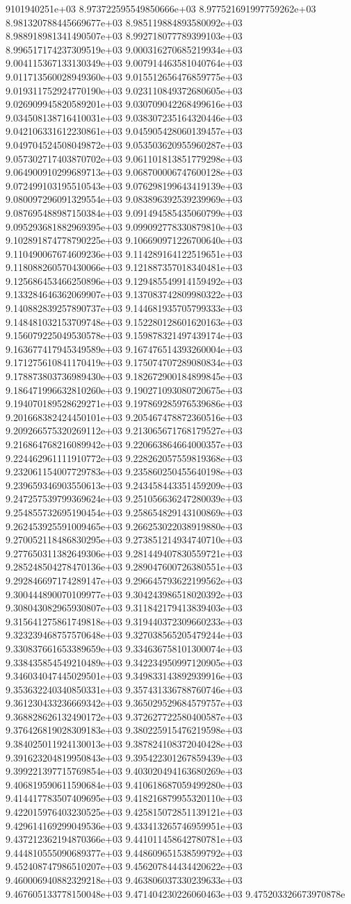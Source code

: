 9101940251e+03	8.973722595549850666e+03	8.977521691997759262e+03	8.981320788445669677e+03	8.985119884893580092e+03	8.988918981341490507e+03	8.992718077789399103e+03	8.996517174237309519e+03	9.000316270685219934e+03	9.004115367133130349e+03	9.007914463581040764e+03	9.011713560028949360e+03	9.015512656476859775e+03	9.019311752924770190e+03	9.023110849372680605e+03	9.026909945820589201e+03	9.030709042268499616e+03	9.034508138716410031e+03	9.038307235164320446e+03	9.042106331612230861e+03	9.045905428060139457e+03	9.049704524508049872e+03	9.053503620955960287e+03	9.057302717403870702e+03	9.061101813851779298e+03	9.064900910299689713e+03	9.068700006747600128e+03	9.072499103195510543e+03	9.076298199643419139e+03	9.080097296091329554e+03	9.083896392539239969e+03	9.087695488987150384e+03	9.091494585435060799e+03	9.095293681882969395e+03	9.099092778330879810e+03	9.102891874778790225e+03	9.106690971226700640e+03	9.110490067674609236e+03	9.114289164122519651e+03	9.118088260570430066e+03	9.121887357018340481e+03	9.125686453466250896e+03	9.129485549914159492e+03	9.133284646362069907e+03	9.137083742809980322e+03	9.140882839257890737e+03	9.144681935705799333e+03	9.148481032153709748e+03	9.152280128601620163e+03	9.156079225049530578e+03	9.159878321497439174e+03	9.163677417945349589e+03	9.167476514393260004e+03	9.171275610841170419e+03	9.175074707289080834e+03	9.178873803736989430e+03	9.182672900184899845e+03	9.186471996632810260e+03	9.190271093080720675e+03	9.194070189528629271e+03	9.197869285976539686e+03	9.201668382424450101e+03	9.205467478872360516e+03	9.209266575320269112e+03	9.213065671768179527e+03	9.216864768216089942e+03	9.220663864664000357e+03	9.224462961111910772e+03	9.228262057559819368e+03	9.232061154007729783e+03	9.235860250455640198e+03	9.239659346903550613e+03	9.243458443351459209e+03	9.247257539799369624e+03	9.251056636247280039e+03	9.254855732695190454e+03	9.258654829143100869e+03	9.262453925591009465e+03	9.266253022038919880e+03	9.270052118486830295e+03	9.273851214934740710e+03	9.277650311382649306e+03	9.281449407830559721e+03	9.285248504278470136e+03	9.289047600726380551e+03	9.292846697174289147e+03	9.296645793622199562e+03	9.300444890070109977e+03	9.304243986518020392e+03	9.308043082965930807e+03	9.311842179413839403e+03	9.315641275861749818e+03	9.319440372309660233e+03	9.323239468757570648e+03	9.327038565205479244e+03	9.330837661653389659e+03	9.334636758101300074e+03	9.338435854549210489e+03	9.342234950997120905e+03	9.346034047445029501e+03	9.349833143892939916e+03	9.353632240340850331e+03	9.357431336788760746e+03	9.361230433236669342e+03	9.365029529684579757e+03	9.368828626132490172e+03	9.372627722580400587e+03	9.376426819028309183e+03	9.380225915476219598e+03	9.384025011924130013e+03	9.387824108372040428e+03	9.391623204819950843e+03	9.395422301267859439e+03	9.399221397715769854e+03	9.403020494163680269e+03	9.406819590611590684e+03	9.410618687059499280e+03	9.414417783507409695e+03	9.418216879955320110e+03	9.422015976403230525e+03	9.425815072851139121e+03	9.429614169299049536e+03	9.433413265746959951e+03	9.437212362194870366e+03	9.441011458642780781e+03	9.444810555090689377e+03	9.448609651538599792e+03	9.452408747986510207e+03	9.456207844434420622e+03	9.460006940882329218e+03	9.463806037330239633e+03	9.467605133778150048e+03	9.471404230226060463e+03	9.475203326673970878e